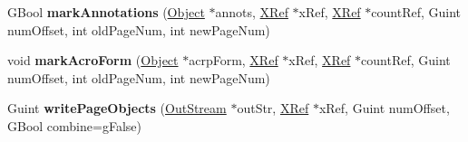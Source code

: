 \begin{DoxyCompactItemize}
\item 
\mbox{\label{class_p_d_f_doc_ad9c4d51862227cfa2ee82021a8ae68c4}} 
G\+Bool {\bfseries mark\+Annotations} (\hyperlink{class_object}{Object} $\ast$annots, \hyperlink{class_x_ref}{X\+Ref} $\ast$x\+Ref, \hyperlink{class_x_ref}{X\+Ref} $\ast$count\+Ref, Guint num\+Offset, int old\+Page\+Num, int new\+Page\+Num)
\item 
\mbox{\label{class_p_d_f_doc_a73b7f2c22bab1cadcddb0fd721b6df5b}} 
void {\bfseries mark\+Acro\+Form} (\hyperlink{class_object}{Object} $\ast$acrp\+Form, \hyperlink{class_x_ref}{X\+Ref} $\ast$x\+Ref, \hyperlink{class_x_ref}{X\+Ref} $\ast$count\+Ref, Guint num\+Offset, int old\+Page\+Num, int new\+Page\+Num)
\item 
\mbox{\label{class_p_d_f_doc_aeb3fa53eeff898746d96e50e493094a2}} 
Guint {\bfseries write\+Page\+Objects} (\hyperlink{class_out_stream}{Out\+Stream} $\ast$out\+Str, \hyperlink{class_x_ref}{X\+Ref} $\ast$x\+Ref, Guint num\+Offset, G\+Bool combine=g\+False)
\end{DoxyCompactItemize}
